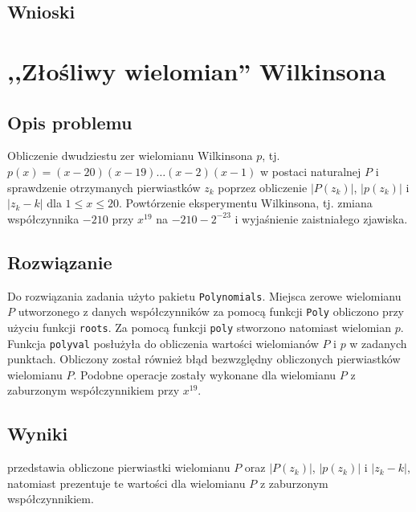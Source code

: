 \documentclass[11pt]{mk-polish-lab-report}
\begin{document}
\subsection{Wnioski}

\section{,,Złośliwy wielomian'' Wilkinsona}

\subsection{Opis problemu}

Obliczenie dwudziestu zer wielomianu Wilkinsona $p$, tj. $p(x) = (x-20)(x-19)\dots(x-2)(x-1)$ w postaci naturalnej $P$ i sprawdzenie otrzymanych pierwiastków $z_k$ poprzez obliczenie $|P(z_k)|$, $|p(z_k)|$ i $|z_k-k|$ dla $1\leq x\leq 20$. Powtórzenie eksperymentu Wilkinsona, tj. zmiana współczynnika $-210$ przy $x^{19}$ na $-210-2^{-23}$ i wyjaśnienie zaistniałego zjawiska.

\subsection{Rozwiązanie}

Do rozwiązania zadania użyto pakietu \texttt{Polynomials}. Miejsca zerowe wielomianu $P$ utworzonego z danych współczynników za pomocą funkcji \texttt{Poly} obliczono przy użyciu funkcji \texttt{roots}. Za pomocą funkcji \texttt{poly} stworzono natomiast wielomian $p$. Funkcja \texttt{polyval} posłużyła do obliczenia wartości wielomianów $P$ i $p$ w zadanych punktach. Obliczony został również błąd bezwzględny obliczonych pierwiastków wielomianu $P$. Podobne operacje zostały wykonane dla wielomianu $P$ z zaburzonym współczynnikiem przy $x^{19}$.

\subsection{Wyniki}

 przedstawia obliczone pierwiastki wielomianu $P$ oraz $|P(z_k)|$, $|p(z_k)|$ i $|z_k-k|$, natomiast  prezentuje te wartości dla wielomianu $P$ z zaburzonym współczynnikiem.
\end{document}
